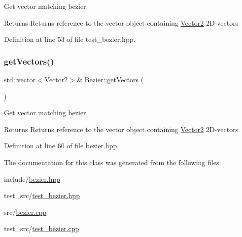 Get vector matching bezier. 

\begin{DoxyReturn}{Returns}
Returns reference to the vector object containing \mbox{\hyperlink{classVector2}{Vector2}} 2\+D-\/vectors 
\end{DoxyReturn}


Definition at line 53 of file test\+\_\+bezier.\+hpp.

\mbox{\label{classBezier_a26bf332b0c831e0f302f1d72ec782436}} 
\subsubsection{\texorpdfstring{get\+Vectors()}{getVectors()}\hspace{0.1cm}{\footnotesize\ttfamily [2/2]}}
{\footnotesize\ttfamily std\+::vector$<$\mbox{\hyperlink{classVector2}{Vector2}}$>$\& Bezier\+::get\+Vectors (\begin{DoxyParamCaption}{ }\end{DoxyParamCaption})\hspace{0.3cm}{\ttfamily [inline]}}



Get vector matching bezier. 

\begin{DoxyReturn}{Returns}
Returns reference to the vector object containing \mbox{\hyperlink{classVector2}{Vector2}} 2\+D-\/vectors 
\end{DoxyReturn}


Definition at line 60 of file bezier.\+hpp.



The documentation for this class was generated from the following files\+:\begin{DoxyCompactItemize}
\item 
include/\mbox{\hyperlink{bezier_8hpp}{bezier.\+hpp}}\item 
test\+\_\+src/\mbox{\hyperlink{test__bezier_8hpp}{test\+\_\+bezier.\+hpp}}\item 
src/\mbox{\hyperlink{bezier_8cpp}{bezier.\+cpp}}\item 
test\+\_\+src/\mbox{\hyperlink{test__bezier_8cpp}{test\+\_\+bezier.\+cpp}}\end{DoxyCompactItemize}
